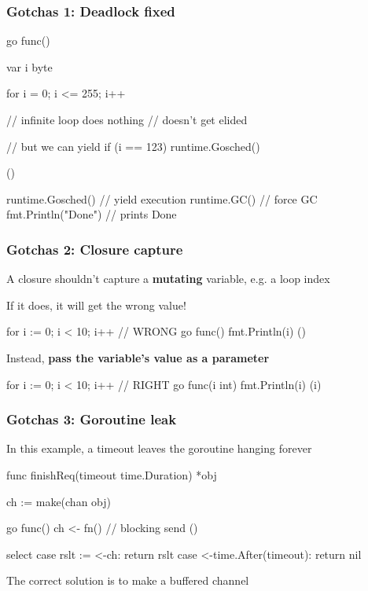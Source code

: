 \documentclass[handout,compress,t,11pt]{beamer}
\begin{document}
\begin{frame}[fragile]
    \frametitle{Gotchas 1: Deadlock fixed}
\begin{golang}
go func() {
    var i byte

    for i = 0; i <= 255; i++ {
        // infinite loop does nothing
        // doesn't get elided

        // but we can yield
		if (i == 123) {
			runtime.Gosched()
		}
    }
}()

runtime.Gosched()    // yield execution
runtime.GC()         // force GC
fmt.Println("Done")  // prints Done
\end{golang}
\end{frame}

\begin{frame}[fragile]
    \frametitle{Gotchas 2: Closure capture}
    A closure shouldn't capture a {\bf mutating} variable, e.g. a loop index \par
    \vspace{0.6\baselineskip}
    If it does, it will get the wrong value! \par
    \vspace{0.2\baselineskip}
\begin{golang}
for i := 0; i < 10; i++ {   // WRONG
    go func() {
        fmt.Println(i)
    }()
}
\end{golang}
    Instead, \alert{\bf pass the variable's value as a parameter}
    \vspace{0.2\baselineskip}
\begin{golang}
for i := 0; i < 10; i++ {  // RIGHT
    go func(i int) {
        fmt.Println(i)
    }(i)
}
\end{golang}
\end{frame}

\begin{frame}[fragile]
    \frametitle{Gotchas 3: Goroutine leak}
    In this example, a timeout leaves the goroutine hanging forever \par
\begin{golang}
func finishReq(timeout time.Duration) *obj {
    ch := make(chan obj)

    go func() {
        ch <- fn() // blocking send
    }()

    select {
    case rslt := <-ch:
        return rslt
    case <-time.After(timeout):
        return nil
    }
}
\end{golang}
    \vspace{0.2\baselineskip}
    The correct solution is to make a buffered channel
\end{frame}
\end{document}

